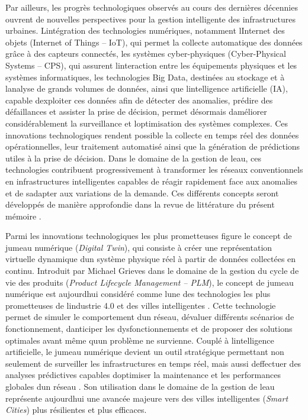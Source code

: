 \documentclass[12pt,a4paper,oneside]{report}
\begin{document}
Par ailleurs, les progrès technologiques observés au cours des dernières
décennies ouvrent de nouvelles perspectives pour la gestion intelligente
des infrastructures urbaines. L\textquotesingle intégration des
technologies numériques, notamment l\textquotesingle Internet des objets
(Internet of Things -- IoT), qui permet la collecte automatique des
données grâce à des capteurs connectés, les systèmes cyber-physiques
(Cyber-Physical Systems -- CPS), qui assurent
l\textquotesingle interaction entre les équipements physiques et les
systèmes informatiques, les technologies Big Data, destinées au stockage
et à l\textquotesingle analyse de grands volumes de données, ainsi que
l\textquotesingle intelligence artificielle (IA), capable
d\textquotesingle exploiter ces données afin de détecter des anomalies,
prédire des défaillances et assister la prise de décision, permet
désormais d\textquotesingle améliorer considérablement la surveillance
et l\textquotesingle optimisation des systèmes complexes. Ces
innovations technologiques rendent possible la collecte en temps réel
des données opérationnelles, leur traitement automatisé ainsi que la
génération de prédictions utiles à la prise de décision. Dans le domaine
de la gestion de l\textquotesingle eau, ces technologies contribuent
progressivement à transformer les réseaux conventionnels en
infrastructures intelligentes capables de réagir rapidement face aux
anomalies et de s\textquotesingle adapter aux variations de la demande.
Ces différents concepts seront développés de manière approfondie dans la
revue de littérature du présent mémoire \cite{ref7}.

Parmi les innovations technologiques les plus prometteuses figure le
concept de jumeau numérique (\emph{Digital Twin}), qui consiste à créer
une représentation virtuelle dynamique d\textquotesingle un système
physique réel à partir de données collectées en continu. Introduit par
Michael Grieves dans le domaine de la gestion du cycle de vie des
produits (\emph{Product Lifecycle Management -- PLM}), le concept de
jumeau numérique est aujourd\textquotesingle hui considéré comme
l\textquotesingle une des technologies les plus prometteuses de
l\textquotesingle industrie 4.0 et des villes intelligentes \cite{ref8}.
Cette technologie permet de simuler le comportement d\textquotesingle un
réseau, d\textquotesingle évaluer différents scénarios de
fonctionnement, d\textquotesingle anticiper les dysfonctionnements et de
proposer des solutions optimales avant même qu\textquotesingle un
problème ne survienne. Couplé à l\textquotesingle intelligence
artificielle, le jumeau numérique devient un outil stratégique
permettant non seulement de surveiller les infrastructures en temps
réel, mais aussi d\textquotesingle effectuer des analyses prédictives
capables d\textquotesingle optimiser la maintenance et les performances
globales d\textquotesingle un réseau \cite{ref9}. Son utilisation dans le
domaine de la gestion de l\textquotesingle eau représente
aujourd\textquotesingle hui une avancée majeure vers des villes
intelligentes (\emph{Smart Cities}) plus résilientes et plus efficaces.
\end{document}
